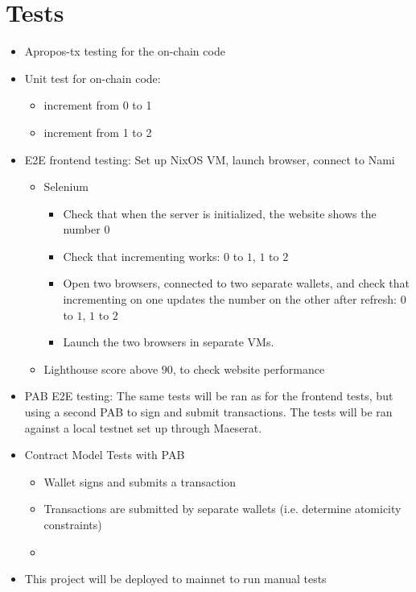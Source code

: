 \documentclass{article}
\begin{document}
\section{Tests}

\begin{itemize}
  \item Apropos-tx testing for the on-chain code
  \item Unit test for on-chain code:
  \begin{itemize}
    \item increment from 0 to 1
    \item increment from 1 to 2
  \end{itemize}
  \item E2E frontend testing: Set up NixOS VM, launch browser, connect to Nami
  \begin{itemize}
    \item Selenium
      \begin{itemize}
        \item Check that when the server is initialized, the website shows the
          number $0$
        \item Check that incrementing works: $0$ to $1$, $1$ to $2$
        \item Open two browsers, connected to two separate wallets, and check
          that incrementing on one updates the number on the other after
          refresh: $0$ to $1$, $1$ to $2$
        \item Launch the two browsers in separate VMs.
      \end{itemize}
    \item Lighthouse score above $90$, to check website performance
  \end{itemize}
  \item PAB E2E testing: The same tests will be ran as for the frontend tests,
    but using a second PAB to sign and submit transactions.
    The tests will be ran against a local testnet set up through Maeserat.
  \item Contract Model Tests with PAB
  \begin{itemize}
    \item Wallet signs and submits a transaction
    \item Transactions are submitted by separate wallets (i.e. determine
      atomicity constraints)
    \item {}
  \end{itemize}
  \item This project will be deployed to mainnet to run manual tests
\end{itemize}
\end{document}
